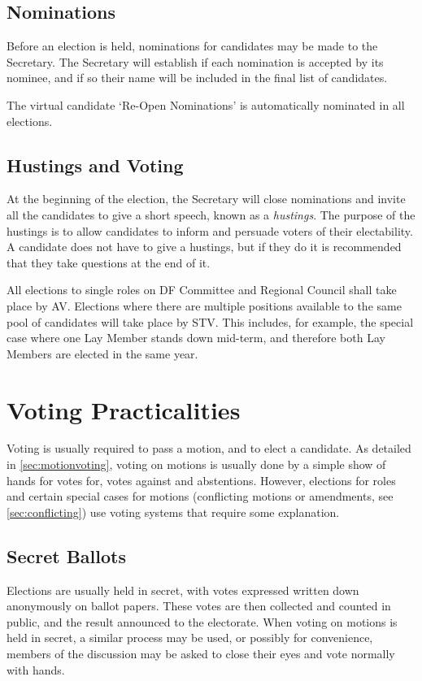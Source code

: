 \documentclass[a4paper, 12pt]{article} %
\begin{document}
\subsection{Nominations}
Before an election is held, nominations for candidates may be made to the Secretary.  The Secretary will establish if each nomination is accepted by its nominee, and if so their name will be included in the final list of candidates.

The virtual candidate `Re-Open Nominations' is automatically nominated in all elections.

\subsection{Hustings and Voting}
At the beginning of the election, the Secretary will close nominations and invite all the candidates to give a short speech, known as a \emph{hustings}.  The purpose of the hustings is to allow candidates to inform and persuade voters of their electability.  A candidate does not have to give a hustings, but if they do it is recommended that they take questions at the end of it.

All elections to single roles on DF Committee and Regional Council shall take place by AV.  Elections where there are multiple positions available to the same pool of candidates will take place by STV.  This includes, for example, the special case where one Lay Member stands down mid-term, and therefore both Lay Members are elected in the same year.

\section{Voting Practicalities}
Voting is usually required to pass a motion, and to elect a candidate.  As detailed in \autoref{sec:motionvoting}, voting on motions is usually done by a simple show of hands for votes for, votes against and abstentions.  However, elections for roles and certain special cases for motions (conflicting motions or amendments, see \autoref{sec:conflicting}) use voting systems that require some explanation.

\subsection{Secret Ballots}
Elections are usually held in secret, with votes expressed written down anonymously on ballot papers.  These votes are then collected and counted in public, and the result announced to the electorate.  When voting on motions is held in secret, a similar process may be used, or possibly for convenience, members of the discussion may be asked to close their eyes and vote normally with hands.
\end{document}
